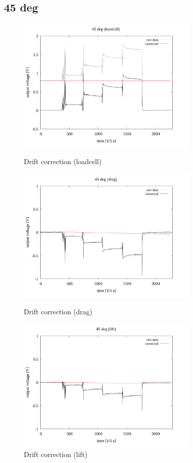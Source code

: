 \documentclass[twocolumn,a4j]{jsarticle}
\begin{document}
\newpage
\subsection{45 deg}
\begin{figure}[htbp]
    \footnotesize
    \begin{center}
        \includegraphics[width=88mm]{../images/drift/45_loadcell_drift.png}
        \caption{Drift correction (loadcell)}
        \includegraphics[width=88mm]{../images/drift/45_drag_drift.png}
        \caption{Drift correction (drag)}
        \includegraphics[width=88mm]{../images/drift/45_lift_drift.png}
        \caption{Drift correction (lift)}
    \end{center}
\end{figure}
\end{document}
